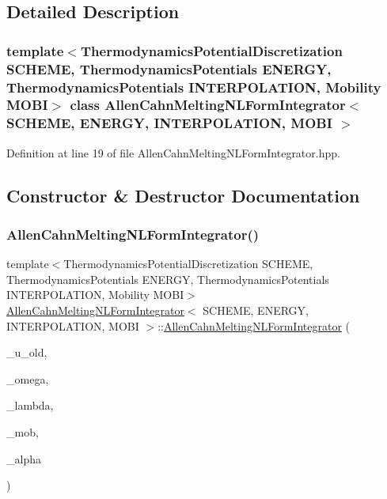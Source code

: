 \subsection{Detailed Description}
\subsubsection*{template$<$Thermodynamics\+Potential\+Discretization S\+C\+H\+E\+ME, Thermodynamics\+Potentials E\+N\+E\+R\+GY, Thermodynamics\+Potentials I\+N\+T\+E\+R\+P\+O\+L\+A\+T\+I\+ON, Mobility M\+O\+BI$>$\newline
class Allen\+Cahn\+Melting\+N\+L\+Form\+Integrator$<$ S\+C\+H\+E\+M\+E, E\+N\+E\+R\+G\+Y, I\+N\+T\+E\+R\+P\+O\+L\+A\+T\+I\+O\+N, M\+O\+B\+I $>$}



Definition at line 19 of file Allen\+Cahn\+Melting\+N\+L\+Form\+Integrator.\+hpp.



\subsection{Constructor \& Destructor Documentation}
\mbox{\label{classAllenCahnMeltingNLFormIntegrator_a56ffb7b7b6963cf1cf8060e82361d861}} 
\subsubsection{\texorpdfstring{Allen\+Cahn\+Melting\+N\+L\+Form\+Integrator()}{AllenCahnMeltingNLFormIntegrator()}}
{\footnotesize\ttfamily template$<$Thermodynamics\+Potential\+Discretization S\+C\+H\+E\+ME, Thermodynamics\+Potentials E\+N\+E\+R\+GY, Thermodynamics\+Potentials I\+N\+T\+E\+R\+P\+O\+L\+A\+T\+I\+ON, Mobility M\+O\+BI$>$ \\
\hyperlink{classAllenCahnMeltingNLFormIntegrator}{Allen\+Cahn\+Melting\+N\+L\+Form\+Integrator}$<$ S\+C\+H\+E\+ME, E\+N\+E\+R\+GY, I\+N\+T\+E\+R\+P\+O\+L\+A\+T\+I\+ON, M\+O\+BI $>$\+::\hyperlink{classAllenCahnMeltingNLFormIntegrator}{Allen\+Cahn\+Melting\+N\+L\+Form\+Integrator} (\begin{DoxyParamCaption}\item[{const mfem\+::\+Grid\+Function \&}]{\+\_\+u\+\_\+old,  }\item[{const double \&}]{\+\_\+omega,  }\item[{const double \&}]{\+\_\+lambda,  }\item[{const double \&}]{\+\_\+mob,  }\item[{\hyperlink{classPhaseChangeCoefficient}{Phase\+Change\+Coefficient}}]{\+\_\+alpha }\end{DoxyParamCaption})}



